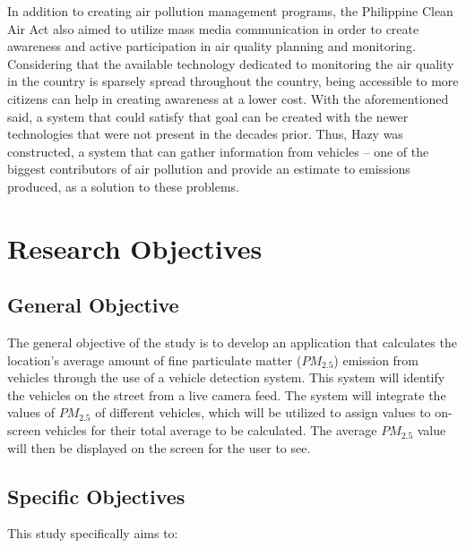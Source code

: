 In addition to creating air pollution management programs, the Philippine Clean Air Act also aimed to utilize mass media communication in order to create awareness and active participation in air quality planning and monitoring. Considering that the available technology dedicated to monitoring the air quality in the country is sparsely spread throughout the country, being accessible to more citizens can help in creating awareness at a lower cost. With the aforementioned said, a system that could satisfy that goal can be created with the newer technologies that were not present in the decades prior. Thus, Hazy was constructed, a system that can gather information from vehicles – one of the biggest contributors of air pollution and provide an estimate to emissions produced, as a solution to these problems. 


\section{Research Objectives}
\label{sec:researchobjectives}

\subsection{General Objective}
\label{sec:generalobjective}


The general objective of the study is to develop an application that calculates the location’s average amount of  fine particulate matter ($PM_{2.5}$) emission from vehicles through the use of a vehicle detection system. This system will identify the vehicles on the street from a live camera feed. The system will integrate the values of $PM_{2.5}$  of different vehicles, which will be utilized to assign values to on-screen vehicles for their total average to be calculated. The average $PM_{2.5}$ value will then be displayed on the screen for the user to see.



\subsection{Specific Objectives}
\label{sec:specificobjectives}

%
%
This study specifically aims to:


